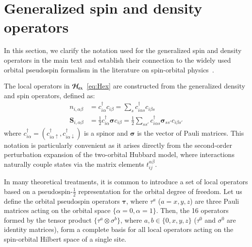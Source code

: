 \documentclass[reprint,superscriptaddress,amsmath,amssymb,aps,twocolumn]{revtex4-1}
\begin{document}



\clearpage


\appendix

\section{Generalized spin and density operators}\label{app:spin_notation}

In this section, we clarify the notation used for the generalized spin and density operators in the main text and establish their connection to the widely used orbital pseudospin formalism in the literature on spin-orbital physics~\cite{1973KK}.

The local operators in $\mathcal{H}_{\rm ex}$~\eqref{eq:Hex} are constructed from the generalized density and spin operators, defined as:
\begin{align}
    n_{i,\alpha\beta} &= c_{i\alpha}^\dagger c_{i\beta} = \sum_{s} c_{i\alpha s}^\dagger c_{i\beta s} \label{eq:app_n_def} \\
    \mathbf{S}_{i,\alpha\beta} &= \frac{1}{2} c_{i\alpha}^\dagger \bm{\sigma} c_{i\beta} = \frac{1}{2} \sum_{ss'} c_{i\alpha s}^\dagger \bm{\sigma}_{ss'} c_{i\beta s'} \label{eq:app_s_def}
\end{align}
where $c_{i\alpha}^\dagger = (c^\dagger_{i\alpha\uparrow}, c^\dagger_{i\alpha\downarrow})$ is a spinor and $\bm{\sigma}$ is the vector of Pauli matrices. This notation is particularly convenient as it arises directly from the second-order perturbation expansion of the two-orbital Hubbard model, where interactions naturally couple states via the matrix elements $t_{ij}^{\alpha\beta}$.

In many theoretical treatments, it is common to introduce a set of local operators based on a pseudospin-$\frac{1}{2}$ representation for the orbital degree of freedom. Let us define the orbital pseudospin operators $\bm{\tau}$, where $\tau^a$ ($a=x,y,z$) are three Pauli matrices acting on the orbital space $\{\alpha=0, \alpha=1\}$.
Then, the 16 operators formed by the tensor product $\{\tau^a \otimes \sigma^b\}$, where $a,b \in \{0, x, y, z\}$ ($\tau^0$ and $\sigma^0$ are identity matrices), form a complete basis for all local operators acting on the spin-orbital Hilbert space of a single site.
\end{document}
